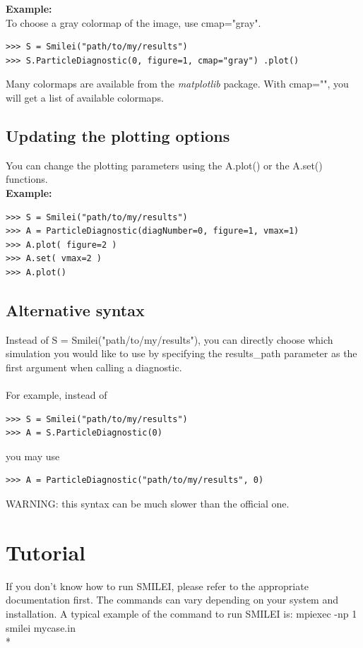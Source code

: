 \documentclass[11pt]{article}
\newcommand{\code}[1]{\colorbox{yellow!15}{\ttfamily #1}}
\begin{document}
\textbf{Example:}\\
To choose a gray colormap of the image, use \code{cmap="gray"}.
\begin{lstlisting}
>>> S = Smilei("path/to/my/results")
>>> S.ParticleDiagnostic(0, figure=1, cmap="gray") .plot()
\end{lstlisting}
Many colormaps are available from the \textit{matplotlib} package. With \code{cmap=""}, you will get a list of available colormaps.


\subsection{Updating the plotting options}

You can change the plotting parameters using the \code{A.plot()} or the \code{A.set()} functions.\\
\textbf{Example:}
\begin{lstlisting}
>>> S = Smilei("path/to/my/results")
>>> A = ParticleDiagnostic(diagNumber=0, figure=1, vmax=1)
>>> A.plot( figure=2 )
>>> A.set( vmax=2 )
>>> A.plot()
\end{lstlisting}


\subsection{Alternative syntax}

Instead of \code{S = Smilei("path/to/my/results")}, you can directly choose which simulation you would like to use
by specifying the \code{results\_path} parameter as the first argument when calling a diagnostic.\\
\\
For example, instead of 
\begin{lstlisting}
>>> S = Smilei("path/to/my/results")
>>> A = S.ParticleDiagnostic(0)
\end{lstlisting}
you may use
\begin{lstlisting}
>>> A = ParticleDiagnostic("path/to/my/results", 0)
\end{lstlisting}

WARNING: this syntax can be much slower than the official one.

\clearpage


\section{Tutorial}

If you don't know how to run SMILEI, please refer to the appropriate documentation first. The commands can vary depending on your system and installation. A typical example of the command to run SMILEI is: \code{mpiexec -np 1 smilei mycase.in}\\*
\end{document}
